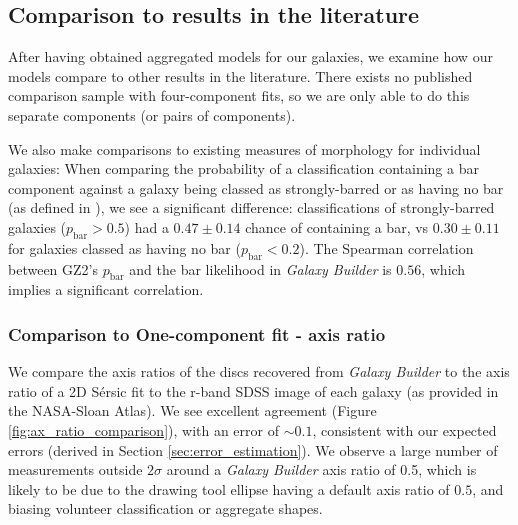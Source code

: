 \documentclass[../main.tex]{subfiles}
\begin{document}
\subsection{Comparison to results in the literature}

After having obtained aggregated models for our galaxies, we examine how our models compare to other results in the literature. There exists no published comparison sample with four-component fits, so we are only able to do this separate components (or pairs of components).

We also make comparisons to existing measures of morphology for individual galaxies: When comparing the probability of a classification containing a bar component against a galaxy being classed as strongly-barred or as having no bar (as defined in \citealt{Masters2010:1003.0449v2}), we see a significant difference: classifications of strongly-barred galaxies ($p_\text{bar} > 0.5$) had a $0.47 \pm 0.14$ chance of containing a bar, vs $0.30 \pm 0.11$ for galaxies classed as having no bar ($p_\text{bar} < 0.2$). The Spearman correlation between GZ2's $p_\text{bar}$ and the bar likelihood in \textit{Galaxy Builder} is $0.56$, which implies a significant correlation.

\subsubsection{Comparison to One-component fit - axis ratio}
We compare the axis ratios of the discs recovered from \textit{Galaxy Builder} to the axis ratio of a 2D S\'ersic fit to the r-band SDSS image of each galaxy (as provided in the NASA-Sloan Atlas). We see excellent agreement (Figure \ref{fig:ax_ratio_comparison}), with an error of $\sim0.1$, consistent with our expected errors (derived in Section \ref{sec:error_estimation}). We observe a large number of measurements outside $2\sigma$ around a \textit{Galaxy Builder} axis ratio of 0.5, which is likely to be due to the drawing tool ellipse having a default axis ratio of $0.5$, and biasing volunteer classification or aggregate shapes.
\end{document}
